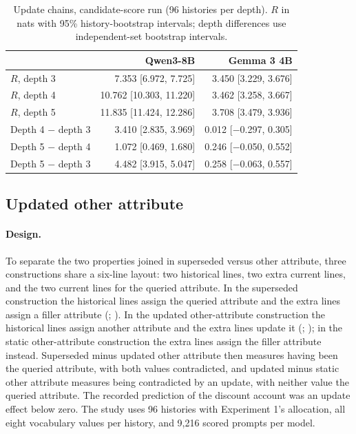 \begin{table}[h]
\caption{Update chains, candidate-score run (96 histories per depth). $R$ in nats with 95\% history-bootstrap intervals; depth differences use independent-set bootstrap intervals.}
\label{tab:f-chains96}
\begin{center}
\small
\begin{tabular}{@{}lrr@{}}
\toprule
 & Qwen3-8B & Gemma 3 4B \\
\midrule
$R$, depth 3 & 7.353 [6.972, 7.725] & 3.450 [3.229, 3.676] \\
$R$, depth 4 & 10.762 [10.303, 11.220] & 3.462 [3.258, 3.667] \\
$R$, depth 5 & 11.835 [11.424, 12.286] & 3.708 [3.479, 3.936] \\
\midrule
Depth 4 $-$ depth 3 & 3.410 [2.835, 3.969] & 0.012 [−0.297, 0.305] \\
Depth 5 $-$ depth 4 & 1.072 [0.469, 1.680] & 0.246 [−0.050, 0.552] \\
Depth 5 $-$ depth 3 & 4.482 [3.915, 5.047] & 0.258 [−0.063, 0.557] \\
\bottomrule
\end{tabular}
\end{center}
\end{table}

\subsection{Updated other attribute}

\paragraph{Design.} To separate the two properties joined in superseded versus other attribute, three constructions share a six-line layout: two historical lines, two extra current lines, and the two current lines for the queried attribute. In the superseded construction the historical lines assign the queried attribute and the extra lines assign a filler attribute (; ). In the updated other-attribute construction the historical lines assign another attribute and the extra lines update it (; ); in the static other-attribute construction the extra lines assign the filler attribute instead. Superseded minus updated other attribute then measures having been the queried attribute, with both values contradicted, and updated minus static other attribute measures being contradicted by an update, with neither value the queried attribute. The recorded prediction of the discount account was an update effect below zero. The study uses 96 histories with Experiment 1's allocation, all eight vocabulary values per history, and 9,216 scored prompts per model.

